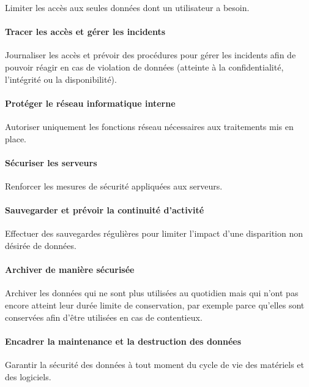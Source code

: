 Limiter les accès aux seules données dont un utilisateur a besoin.

\paragraph{Tracer les accès et gérer les incidents}

Journaliser les accès et prévoir des procédures pour gérer les incidents
afin de pouvoir réagir en cas de violation de données (atteinte à la
confidentialité, l'intégrité ou la disponibilité).

\paragraph{Protéger le réseau informatique interne}

Autoriser uniquement les fonctions réseau nécessaires aux traitements
mis en place.

\paragraph{Sécuriser les serveurs}

Renforcer les mesures de sécurité appliquées aux serveurs.

\paragraph{Sauvegarder et prévoir la continuité d'activité}

Effectuer des sauvegardes régulières pour limiter l'impact d'une
disparition non désirée de données.

\paragraph{Archiver de manière sécurisée}

Archiver les données qui ne sont plus utilisées au quotidien mais qui
n'ont pas encore atteint leur durée limite de conservation, par exemple
parce qu'elles sont conservées afin d'être utilisées en cas de
contentieux.

\paragraph{Encadrer la maintenance et la destruction des données}

Garantir la sécurité des données à tout moment du cycle de vie des
matériels et des logiciels.

